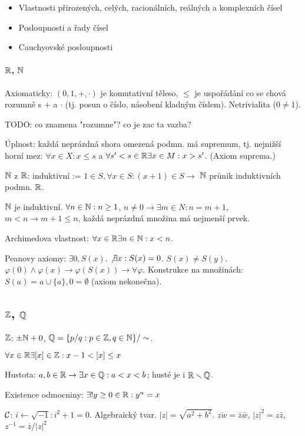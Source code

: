 \begin{itemize}
\item Vlastnosti přirozených, celých, racionálních, reálných a komplexních
	čísel
\item Posloupnosti a řady čísel
\item Cauchyovské posloupnosti
\end{itemize}

\paragraph{$\mathbb{R}$, $\mathbb{N}$}
Axiomaticky: $(0,1,+,\cdot)$ je komutativní těleso, $\leq$ je uspořádání co se
chová rozumně s $+$ a $\cdot$ (tj. posun o číslo, násobení kladným číslem).
Netrivialita ($0\neq 1$).

TODO: co znamena "rozumne"? co je zac ta vazba?

Úplnost: každá neprázdná shora omezená podmn. má supremum, tj. nejnižší horní
mez: $\forall x\in X: x\leq s$ a $\forall s'<s\in\mathbb{R} \exists x\in M: x>s'$.
(Axiom suprema.)

$\mathbb{N}$ z $\mathbb{R}$: induktivní := $1\in S, \forall x\in S: (x+1)\in S \longrightarrow$
$\mathbb{N}$ průnik induktivních podmn. $\mathbb{R}$.

$\mathbb{N}$ je induktivní. $\forall n\in\mathbb{N}:n\geq 1$,
$n\neq 0\rightarrow\exists m\in N: n=m+1$, $m<n\rightarrow m+1\leq n$,
každá neprázdná množina má nejmenší prvek.

Archimedova vlastnost: $\forall x\in\mathbb{R}\exists n\in\mathbb{N}:x<n$.

Peanovy axiomy: $\exists 0, S(x)$. $\not\exists x: S(x)=0$. $S(x)\neq S(y)$.
$\varphi(0)\wedge \varphi(x)\rightarrow\varphi(S(x))\longrightarrow\forall\varphi$.
Konstrukce na množinách: $S(a)=a\cup\{a\},0=\emptyset$ (axiom nekonečna).

\subsection{$\mathbb{Z}$, $\mathbb{Q}$}
$\mathbb{Z}$: $\pm\mathbb{N} + 0$, $\mathbb{Q}=\{p/q:p\in\mathbb{Z},q\in\mathbb{N}\}/\sim$.

$\forall x\in\mathbb{R}\exists [x]\in\mathbb{Z}: x-1<[x]\leq x$

Hustota: $a,b\in\mathbb{R}\rightarrow\exists x\in\mathbb{Q}: a<x<b$; husté je i
$\mathbb{R}\smallsetminus\mathbb{Q}$.

Existence odmocniny: $\exists! y\geq 0\in\mathbb{R}: y^n=x$

$\mathcal{C}$: $i\gets\sqrt{-1}:i^2+1=0$. Algebraický tvar.
$|z|=\sqrt{a^2+b^2}$. $\bar{zw}=\bar{z}\bar{w}$, $|z|^2=z\bar{z}$,
$z^{-1}=\bar{z}/|z|^2$

